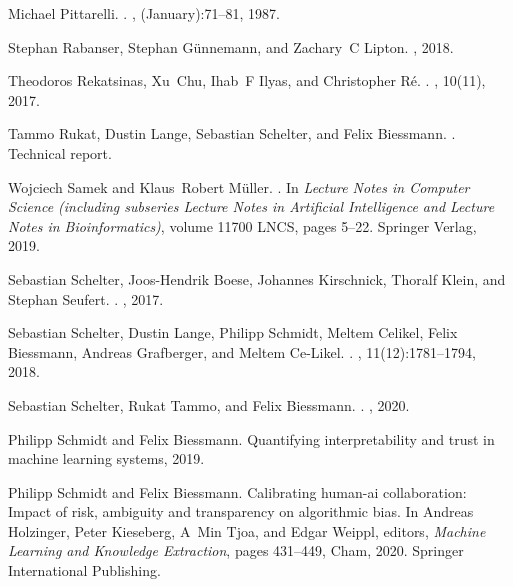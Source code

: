 \documentclass[11pt]{article}
\begin{document}
\begin{thebibliography}{10}
Michael Pittarelli.
.
, (January):71--81, 1987.

Stephan Rabanser, Stephan G{\"{u}}nnemann, and Zachary~C Lipton.
, 2018.

Theodoros Rekatsinas, Xu~Chu, Ihab~F Ilyas, and Christopher R{\'{e}}.
.
, 10(11), 2017.

Tammo Rukat, Dustin Lange, Sebastian Schelter, and Felix Biessmann.
.
\newblock Technical report.

Wojciech Samek and Klaus~Robert M{\"{u}}ller.
.
\newblock In {\em Lecture Notes in Computer Science (including subseries
  Lecture Notes in Artificial Intelligence and Lecture Notes in
  Bioinformatics)}, volume 11700 LNCS, pages 5--22. Springer Verlag, 2019.

Sebastian Schelter, Joos-Hendrik Boese, Johannes Kirschnick, Thoralf Klein, and
  Stephan Seufert.
.
, 2017.

Sebastian Schelter, Dustin Lange, Philipp Schmidt, Meltem Celikel, Felix
  Biessmann, Andreas Grafberger, and Meltem Ce-Likel.
.
, 11(12):1781--1794, 2018.

Sebastian Schelter, Rukat Tammo, and Felix Biessmann.
.
, 2020.

Philipp Schmidt and Felix Biessmann.
\newblock Quantifying interpretability and trust in machine learning systems,
  2019.

Philipp Schmidt and Felix Biessmann.
\newblock Calibrating human-ai collaboration: Impact of risk, ambiguity and
  transparency on algorithmic bias.
\newblock In Andreas Holzinger, Peter Kieseberg, A~Min Tjoa, and Edgar Weippl,
  editors, {\em Machine Learning and Knowledge Extraction}, pages 431--449,
  Cham, 2020. Springer International Publishing.


\end{thebibliography}
\end{document}
